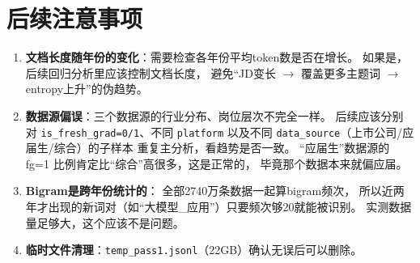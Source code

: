 \documentclass[12pt,a4paper]{ctexart}
\begin{document}
\section{后续注意事项}
\label{sec:notes}

\begin{enumerate}
\item \textbf{文档长度随年份的变化}：需要检查各年份平均token数是否在增长。
如果是，后续回归分析里应该控制文档长度，
避免``JD变长 $\to$ 覆盖更多主题词 $\to$ entropy上升''的伪趋势。

\item \textbf{数据源偏误}：三个数据源的行业分布、岗位层次不完全一样。
后续应该分别对 \texttt{is\_fresh\_grad=0/1}、不同 \texttt{platform}
以及不同 \texttt{data\_source}（上市公司/应届生/综合）的子样本
重复主分析，看趋势是否一致。
``应届生''数据源的 fg=1 比例肯定比``综合''高很多，这是正常的，
毕竟那个数据本来就偏应届。

\item \textbf{Bigram是跨年份统计的}：
全部2740万条数据一起算bigram频次，
所以近两年才出现的新词对（如``大模型\_应用''）只要频次够20就能被识别。
实测数据量足够大，这个应该不是问题。

\item \textbf{临时文件清理}：\texttt{temp\_pass1.jsonl}（22GB）确认无误后可以删除。
\end{enumerate}
\end{document}
